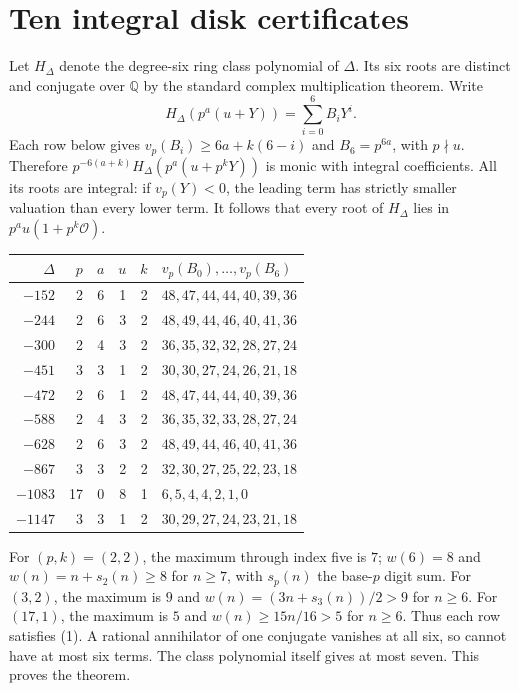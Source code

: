 \documentclass[11pt]{article}
\newcommand{\Q}{\mathbb Q}
\newcommand{\vp}{v_p}
\begin{document}
\section*{Ten integral disk certificates}
Let $H_\Delta$ denote the degree-six ring class polynomial of $\Delta$.
Its six roots are distinct and conjugate over $\Q$ by the standard
complex multiplication theorem. Write
\[
 H_\Delta(p^a(u+Y))=\sum_{i=0}^6 B_iY^i .
\]
Each row below gives $\vp(B_i)\ge 6a+k(6-i)$ and $B_6=p^{6a}$, with
$p\nmid u$. Therefore $p^{-6(a+k)}H_\Delta(p^a(u+p^kY))$ is monic
with integral coefficients. All its roots are integral: if $\vp(Y)<0$,
the leading term has strictly smaller valuation than every lower term.
It follows that every root of $H_\Delta$ lies in
$p^au(1+p^k\mathcal O)$.

\medskip
\begin{center}
\begin{tabular}{@{}rrrrrl@{}}
\toprule
$\Delta$&$p$&$a$&$u$&$k$&\multicolumn{1}{l}{$\vp(B_0),\ldots,\vp(B_6)$}\\
\midrule
$-152$&2&6&1&2&$48,47,44,44,40,39,36$\\
$-244$&2&6&3&2&$48,49,44,46,40,41,36$\\
$-300$&2&4&3&2&$36,35,32,32,28,27,24$\\
$-451$&3&3&1&2&$30,30,27,24,26,21,18$\\
$-472$&2&6&1&2&$48,47,44,44,40,39,36$\\
$-588$&2&4&3&2&$36,35,32,33,28,27,24$\\
$-628$&2&6&3&2&$48,49,44,46,40,41,36$\\
$-867$&3&3&2&2&$32,30,27,25,22,23,18$\\
$-1083$&17&0&8&1&$6,5,4,4,2,1,0$\\
$-1147$&3&3&1&2&$30,29,27,24,23,21,18$\\
\bottomrule
\end{tabular}
\end{center}

For $(p,k)=(2,2)$, the maximum through index five is $7$;
$w(6)=8$ and $w(n)=n+s_2(n)\ge8$ for $n\ge7$, with $s_p(n)$ the
base-$p$ digit sum. For $(3,2)$, the maximum is $9$ and
$w(n)=(3n+s_3(n))/2>9$ for $n\ge6$. For $(17,1)$, the maximum is $5$ and
$w(n)\ge15n/16>5$ for $n\ge6$. Thus each row satisfies (1).
A rational annihilator of one conjugate vanishes at all six, so cannot
have at most six terms. The class polynomial itself gives at most seven.
This proves the theorem.
\end{document}
